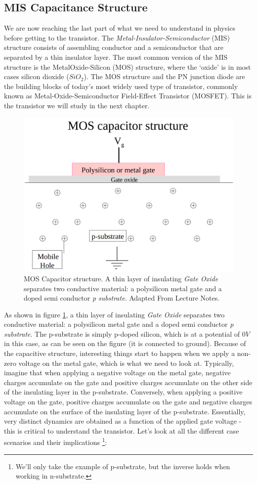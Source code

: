 \subsection{MIS Capacitance Structure}\label{sec:mis_capacitance_structure}

We are now reaching the last part of what we need to understand in physics before getting to the transistor.
The \textit{Metal-Insulator-Semiconductor} (MIS) structure consists of assembling conductor and a semiconductor that are separated by a thin insulator layer. The most common version of the MIS structure is the MetalOxide-Silicon (MOS) structure, where the ‘oxide’ is in most cases silicon dioxide ($SiO_2$). The MOS structure and the PN junction diode are the building blocks of today’s most widely used type of transistor, commonly known as Metal-Oxide-Semiconductor Field-Effect Transistor (MOSFET). This is the transistor we will study in the next chapter. 

\begin{figure}[H]
    \centering
    \includegraphics[width=0.6\linewidth]{../../Figures/MOS Structure.PNG}
    \caption{MOS Capacitor structure. A thin layer of insulating \textit{Gate Oxide} separates two conductive material: a polysilicon metal gate and a doped semi conductor \textit{p substrate}. Adapted From Lecture Notes.}
    \label{fig:MOS Structure}
\end{figure}

As shown in figure \ref{fig:MOS Structure}, a thin layer of insulating \textit{Gate Oxide} separates two conductive material: a polysilicon metal gate and a doped semi conductor \textit{p substrate}. The p-substrate is simply p-doped silicon, which is at a potential of $0V$ in this case, as can be seen on the figure (it is connected to ground). Because of the capacitive structure, interesting things start to happen when we apply a non-zero voltage on the metal gate, which is what we need to look at. Typically, imagine that when applying a negative voltage on the metal gate, negative charges accumulate on the gate and positive charges accumulate on the other side of the insulating layer in the p-substrate. Conversely, when applying a positive voltage on the gate, positive charges accumulate on the gate and negative charges accumulate on the surface of the insulating layer of the p-substrate. Essentially, very distinct dynamics are obtained as a function of the applied gate voltage - this is critical to understand the transistor. Let's look at all the different case scenarios and their implications \footnote{We'll only take the example of p-substrate, but the inverse holds when working in n-substrate.}: 

